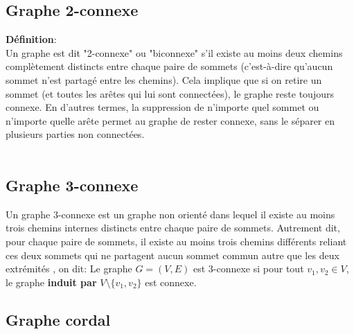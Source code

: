 \documentclass[hidelinks,letterpaper,12pt]{article}
\newtheorem{theorem}{Theorem}[section]
\begin{document}
\subsection{Graphe 2-connexe}
\label{Graphe 2-connexe}
\textbf{Définition}:
\\
Un graphe est dit "2-connexe" ou "biconnexe" s'il existe au moins deux chemins complètement distincts entre chaque paire de sommets (c'est-à-dire qu'aucun sommet n'est partagé entre les chemins). Cela implique que si on retire un sommet (et toutes les arêtes qui lui sont connectées), le graphe reste toujours connexe\citep{west2001introduction}. En d'autres termes, la suppression de n'importe quel sommet ou n'importe quelle arête permet au graphe de rester connexe, sans le séparer en plusieurs parties non connectées\citep{belbeze2012}.
\\ \\	
\noindent{}		

\subsection{Graphe 3-connexe}
\label{Graphe 3-connexe}

Un graphe 3-connexe est un graphe non orienté dans lequel il existe au moins trois chemins internes distincts entre chaque paire de sommets. Autrement dit, pour chaque paire de sommets, il existe au moins trois chemins différents reliant ces deux sommets qui ne partagent aucun sommet commun autre que les deux extrémités \citep{Bondy-Murty}, on dit: Le graphe \( G = (V, E) \) est 3-connexe si pour tout \( v_1, v_2 \in V \), le graphe \textbf{induit par}  $ V \setminus \{v_1,v_2\} $ est connexe.

\subsection{Graphe cordal}
\label{Graphe cordal}
\end{document}
